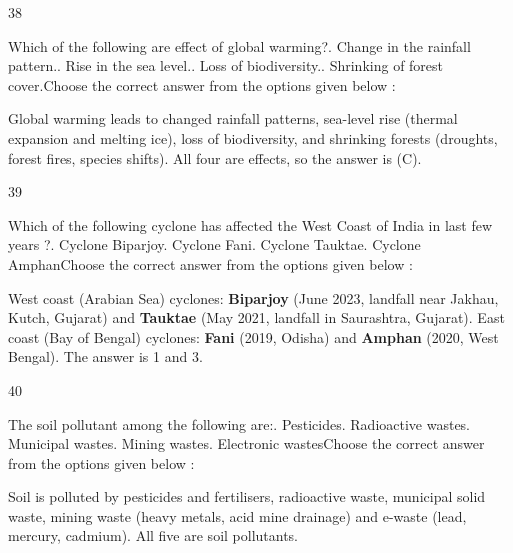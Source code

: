 \begin{question}{38}
{Which of the following are effect of global warming?. Change in the rainfall pattern.. Rise in the sea level.. Loss of biodiversity.. Shrinking of forest cover.\newline Choose the correct answer from the options given below :\par}
\begin{explain}
Global warming leads to changed rainfall patterns, sea-level rise (thermal expansion and melting ice), loss of biodiversity, and shrinking forests (droughts, forest fires, species shifts). All four are effects, so the answer is (C).
\end{explain}
\end{question}

\begin{question}{39}
{Which of the following cyclone has affected the West Coast of India in last few years ?. Cyclone Biparjoy. Cyclone Fani. Cyclone Tauktae. Cyclone Amphan\newline Choose the correct answer from the options given below :\par}
\begin{explain}
West coast (Arabian Sea) cyclones: \textbf{Biparjoy} (June 2023, landfall near Jakhau, Kutch, Gujarat) and \textbf{Tauktae} (May 2021, landfall in Saurashtra, Gujarat).
East coast (Bay of Bengal) cyclones: \textbf{Fani} (2019, Odisha) and \textbf{Amphan} (2020, West Bengal).
The answer is 1 and 3.
\end{explain}
\end{question}

\begin{question}{40}
{The soil pollutant among the following are:. Pesticides. Radioactive wastes. Municipal wastes. Mining wastes. Electronic wastes\newline Choose the correct answer from the options given below :\par}
\begin{explain}
Soil is polluted by pesticides and fertilisers, radioactive waste, municipal solid waste, mining waste (heavy metals, acid mine drainage) and e-waste (lead, mercury, cadmium). All five are soil pollutants.
\end{explain}
\end{question}

